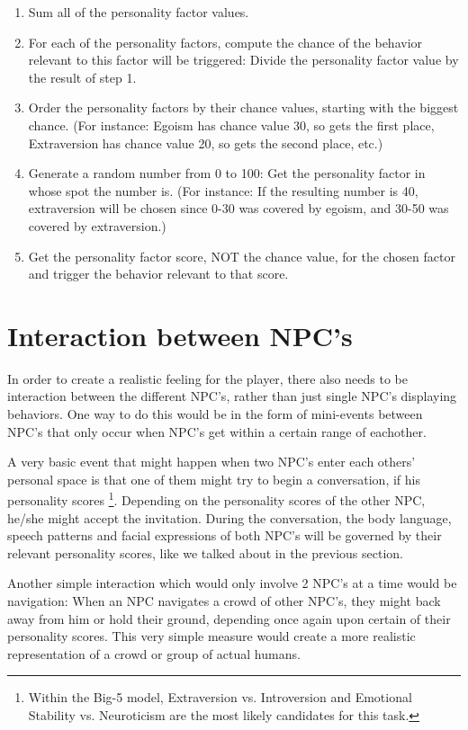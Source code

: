 \documentclass{article}
\begin{document}
    \begin{enumerate}
    	\item Sum all of the personality factor values. 
    	\item For each of the personality factors, compute the chance of the behavior relevant to this factor will be triggered: Divide the personality factor value by the result of step 1.
    	\item Order the personality factors by their chance values, starting with the biggest chance. (For instance: Egoism has chance value 30, so gets the first place, Extraversion has chance value 20, so gets the second place, etc.)
    	\item Generate a random number from 0 to 100: Get the personality factor in whose spot the number is. (For instance: If the resulting number is 40, extraversion will be chosen since 0-30 was covered by egoism, and 30-50 was covered by extraversion.)
    	\item Get the personality factor score, NOT the chance value, for the chosen factor and trigger the behavior relevant to that score.
    \end{enumerate}


	\newpage
	\section{Interaction between NPC's}
	In order to create a realistic feeling for the player, there also needs to be interaction between the different NPC's, rather than just single NPC's displaying behaviors. One way to do this would be in the form of mini-events between NPC's that only occur when NPC's get within a certain range of eachother. 

	A very basic event that might happen when two NPC's enter each others' personal space is that one of them might try to begin a conversation, if his personality scores \footnote{Within the Big-5 model, Extraversion vs. Introversion and Emotional Stability vs. Neuroticism are the most likely candidates for this task.}. Depending on the personality scores of the other NPC, he/she might accept the invitation. During the conversation, the body language, speech patterns and facial expressions of both NPC's will be governed by their relevant personality scores, like we talked about in the previous section.

	Another simple interaction which would only involve 2 NPC's at a time would be navigation: When an NPC navigates a crowd of other NPC's, they might back away from him or hold their ground, depending once again upon certain of their personality scores. This very simple measure would create a more realistic representation of a crowd or group of actual humans.
\end{document}
